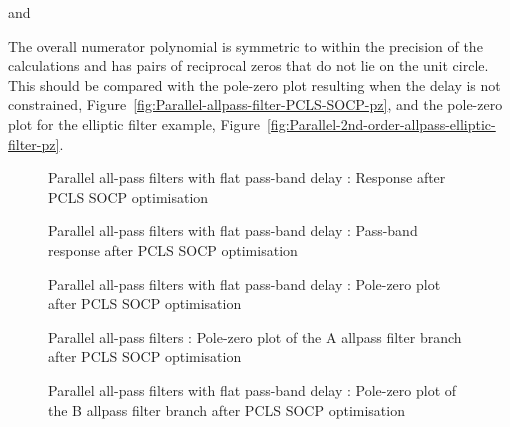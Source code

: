 \documentclass[a4paper,twoside,10pt,english]{report}
\begin{document}
and
\begin{small}

\end{small}
The overall numerator polynomial is symmetric to within the precision of the
calculations and has pairs of reciprocal zeros that do not lie on the unit 
circle. This should be compared with the pole-zero plot resulting when the
delay is not constrained, Figure~\ref{fig:Parallel-allpass-filter-PCLS-SOCP-pz},
and the pole-zero plot for the elliptic filter example, 
Figure~\ref{fig:Parallel-2nd-order-allpass-elliptic-filter-pz}.
\begin{figure}[!htbp]
\begin{center}
\scalebox{0.7}{}
\caption{Parallel all-pass filters with flat pass-band delay : Response after PCLS SOCP optimisation}
\label{fig:Parallel-allpass-filter-flat-delay-PCLS-SOCP-response}
\end{center}
\end{figure}
\begin{figure}[!htbp]
\begin{center}
\scalebox{0.7}{}
\caption{Parallel all-pass filters with flat pass-band delay : Pass-band response after PCLS SOCP optimisation}
\label{fig:Parallel-allpass-filter-flat-delay-PCLS-SOCP-pass-band-response}
\end{center}
\end{figure}
\begin{figure}[!htbp]
\begin{center}
\scalebox{0.7}{}
\caption{Parallel all-pass filters with flat pass-band delay : Pole-zero plot after PCLS SOCP optimisation}
\label{fig:Parallel-allpass-filter-flat-delay-PCLS-SOCP-pz}
\end{center}
\end{figure}
\begin{figure}[!htbp]
\begin{center}
\scalebox{0.7}{}
\caption{Parallel all-pass filters : Pole-zero plot of the A allpass filter branch after PCLS SOCP optimisation}
\label{fig:Parallel-allpass-filter-flat-delay-PCLS-SOCP-a1pz}
\end{center}
\end{figure}
\begin{figure}[!htbp]
\begin{center}
\scalebox{0.7}{}
\caption{Parallel all-pass filters with flat pass-band delay : Pole-zero plot of the B allpass filter branch after PCLS SOCP optimisation}
\label{fig:Parallel-allpass-filter-flat-delay-PCLS-SOCP-b1pz}
\end{center}
\end{figure}
\clearpage
\end{document}
